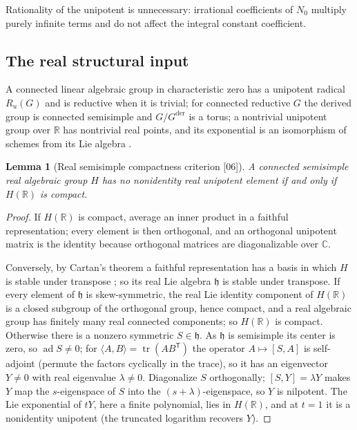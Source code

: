 \documentclass[11pt,oneside]{article}
\numberwithin{equation}{section}
\newtheorem{lemma}[lemma]{Lemma}
\theoremstyle{definition}
\theoremstyle{remark}
\newcommand{\R}{\mathbb R}
\newcommand{\C}{\mathbb C}
\newcommand{\tr}{\operatorname{tr}}
\newcommand{\der}{\mathrm{der}}
\newcommand{\src}[1]{\textup{\textsf{\small[#1]}}}
\begin{document}
Rationality of the unipotent is unnecessary: irrational coefficients of $N_0$
multiply purely infinite terms and do not affect the integral constant
coefficient.

\subsection{The real structural input}

A connected linear algebraic group in characteristic zero has a unipotent
radical $R_u(G)$ and is reductive when it is trivial; for connected reductive
$G$ the derived group is connected semisimple and $G/G^{\der}$ is a torus; a
nontrivial unipotent group over $\R$ has nontrivial real points, and its
exponential is an isomorphism of schemes from its Lie algebra
\cite[Proposition~14.32]{MilneAG}.

\begin{lemma}[Real semisimple compactness criterion \src{06}]\label{ogl:alg:lem:compact}
A connected semisimple real algebraic group $H$ has no nonidentity real
unipotent element if and only if $H(\R)$ is compact.
\end{lemma}
\begin{proof}
If $H(\R)$ is compact, average an inner product in a faithful representation;
every element is then orthogonal, and an orthogonal unipotent matrix is the
identity because orthogonal matrices are diagonalizable over $\C$.

Conversely, by Cartan's theorem a faithful representation has a basis in which
$H$ is stable under transpose \cite[Theorem~1.16 and Example~1.17(c)]{MilneSV};
so its real Lie algebra $\mathfrak h$ is stable under transpose. If every
element of $\mathfrak h$ is skew-symmetric, the real Lie identity component of
$H(\R)$ is a closed subgroup of the orthogonal group, hence compact, and a real
algebraic group has finitely many real connected components; so $H(\R)$ is
compact. Otherwise there is a nonzero symmetric $S\in\mathfrak h$. As
$\mathfrak h$ is semisimple its center is zero, so $\operatorname{ad}S\ne0$;
for $\langle A,B\rangle=\tr(AB^{\mathsf T})$ the operator $A\mapsto[S,A]$ is
self-adjoint (permute the factors cyclically in the trace), so it has an
eigenvector $Y\ne0$ with real eigenvalue $\lambda\ne0$. Diagonalize $S$
orthogonally; $[S,Y]=\lambda Y$ makes $Y$ map the $s$-eigenspace of $S$ into
the $(s+\lambda)$-eigenspace, so $Y$ is nilpotent. The Lie exponential of $tY$,
here a finite polynomial, lies in $H(\R)$, and at $t=1$ it is a nonidentity
unipotent (the truncated logarithm recovers $Y$).
\end{proof}
\end{document}
